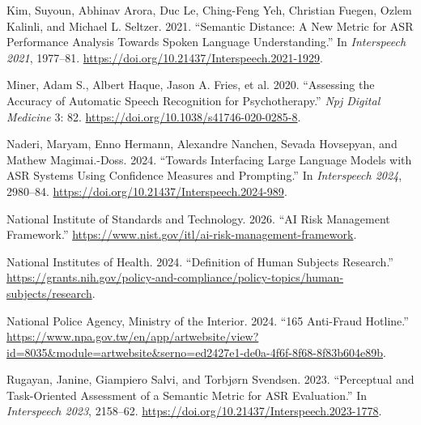\documentclass[
]{article}
\newlength{\cslhangindent}
\newlength{\cslentryspacingunit} %
\newenvironment{CSLReferences}[2] %
 {%
  \setlength{\parindent}{0pt}
  \ifodd #1
  \let\oldpar\par
  \def\par{\hangindent=\cslhangindent\oldpar}
  \fi
  \setlength{\parskip}{#2\cslentryspacingunit}
 }%
 {}
\begin{document}
\begin{CSLReferences}{1}{0}
\leavevmode{}%
Kim, Suyoun, Abhinav Arora, Duc Le, Ching-Feng Yeh, Christian Fuegen,
Ozlem Kalinli, and Michael L. Seltzer. 2021. {``Semantic Distance: A New
Metric for ASR Performance Analysis Towards Spoken Language
Understanding.''} In \emph{Interspeech 2021}, 1977--81.
\url{https://doi.org/10.21437/Interspeech.2021-1929}.

\leavevmode{}%
Miner, Adam S., Albert Haque, Jason A. Fries, et al. 2020. {``Assessing
the Accuracy of Automatic Speech Recognition for Psychotherapy.''}
\emph{Npj Digital Medicine} 3: 82.
\url{https://doi.org/10.1038/s41746-020-0285-8}.

\leavevmode{}%
Naderi, Maryam, Enno Hermann, Alexandre Nanchen, Sevada Hovsepyan, and
Mathew Magimai.-Doss. 2024. {``Towards Interfacing Large Language Models
with ASR Systems Using Confidence Measures and Prompting.''} In
\emph{Interspeech 2024}, 2980--84.
\url{https://doi.org/10.21437/Interspeech.2024-989}.

\leavevmode{}%
National Institute of Standards and Technology. 2026. {``AI Risk
Management Framework.''}
\url{https://www.nist.gov/itl/ai-risk-management-framework}.

\leavevmode{}%
National Institutes of Health. 2024. {``Definition of Human Subjects
Research.''}
\url{https://grants.nih.gov/policy-and-compliance/policy-topics/human-subjects/research}.

\leavevmode{}%
National Police Agency, Ministry of the Interior. 2024. {``165
Anti-Fraud Hotline.''}
\url{https://www.npa.gov.tw/en/app/artwebsite/view?id=8035\&module=artwebsite\&serno=ed2427e1-de0a-4f6f-8f68-8f83b604e89b}.

\leavevmode{}%
Rugayan, Janine, Giampiero Salvi, and Torbjørn Svendsen. 2023.
{``Perceptual and Task-Oriented Assessment of a Semantic Metric for ASR
Evaluation.''} In \emph{Interspeech 2023}, 2158--62.
\url{https://doi.org/10.21437/Interspeech.2023-1778}.

\end{CSLReferences}
\end{document}
